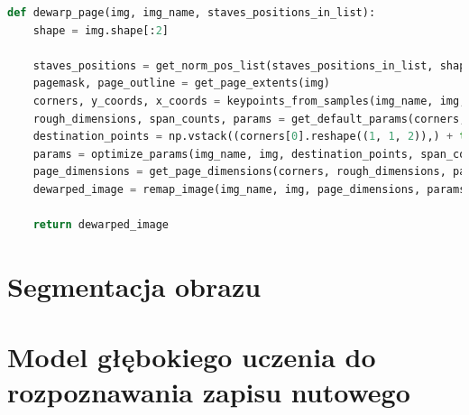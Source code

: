 \begin{lstlisting}[caption={\pyth|dewarp_page()| - główna funkcja usuwania wypaczania obrazu}, label={dewarp-page}, language=Python]
def dewarp_page(img, img_name, staves_positions_in_list):
	shape = img.shape[:2]
	
	staves_positions = get_norm_pos_list(staves_positions_in_list, shape)
	pagemask, page_outline = get_page_extents(img)
	corners, y_coords, x_coords = keypoints_from_samples(img_name, img, pagemask, page_outline, staves_positions)
	rough_dimensions, span_counts, params = get_default_params(corners, y_coords, x_coords)
	destination_points = np.vstack((corners[0].reshape((1, 1, 2)),) + tuple(staves_positions))
	params = optimize_params(img_name, img, destination_points, span_counts, params)
	page_dimensions = get_page_dimensions(corners, rough_dimensions, params)
	dewarped_image = remap_image(img_name, img, page_dimensions, params)
	
	return dewarped_image
\end{lstlisting}

\section{Segmentacja obrazu}

\section{Model głębokiego uczenia do rozpoznawania zapisu nutowego}


















